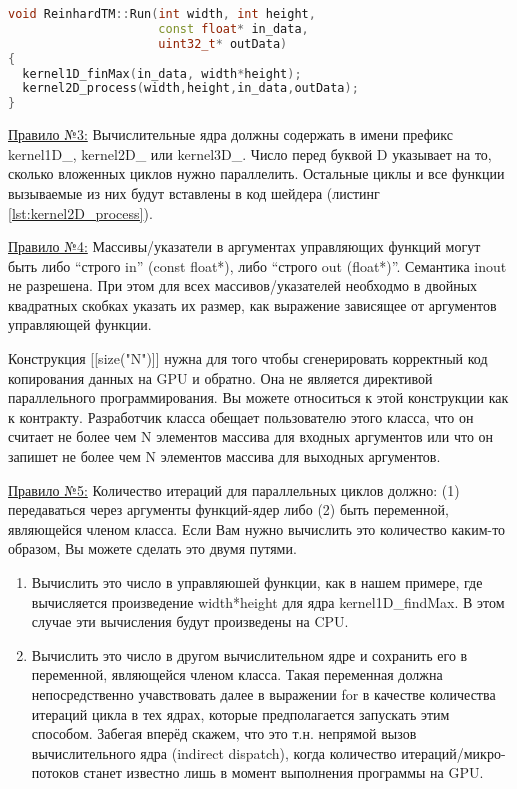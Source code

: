 \documentclass[11pt,fleqn,english,russian]{report} %
\begin{document}
\begin{lstlisting}[language=C++, 
	               caption=реализация управляющей функции Run, 
	               label=lst:RunFunc]	
void ReinhardTM::Run(int width, int height, 
                     const float* in_data, 
                     uint32_t* outData)
{
  kernel1D_finMax(in_data, width*height);
  kernel2D_process(width,height,in_data,outData);
}
\end{lstlisting}

\underline{Правило №3:} Вычислительные ядра должны содержать в имени префикс kernel1D\_, kernel2D\_ или kernel3D\_. Число перед буквой D указывает на то, сколько вложенных циклов нужно параллелить. Остальные циклы и все функции вызываемые из них будут вставлены в код шейдера (листинг \ref{lst:kernel2D_process}). 

\underline{Правило №4:} Массивы/указатели в аргументах управляющих функций могут быть либо ``строго in'' (const float*), либо ``строго out (float*)''. Семантика inout не разрешена. При этом для всех массивов/указателей необходмо в двойных квадратных скобках указать их размер, как выражение зависящее от аргументов управляющей функции.  

\begin{remark}
Конструкция [[size("N")]] нужна для того чтобы сгенерировать корректный код копирования данных на GPU и обратно. Она не является директивой параллельного программирования. Вы можете относиться к этой конструкции как к контракту. Разработчик класса обещает пользователю этого класса, что он считает не более чем N элементов массива для входных аргументов или что он запишет не более чем N элементов массива для выходных аргументов. 
\end{remark}	


\underline{Правило №5:} Количество итераций для параллельных циклов должно: (1) передаваться через аргументы функций-ядер либо (2) быть переменной, являющейся членом класса. Если Вам нужно вычислить это количество каким-то образом, Вы можете сделать это двумя путями.
\begin{enumerate}
\item Вычислить это число в управляюшей функции, как в нашем примере, где вычисляется произведение width*height для ядра kernel1D\_findMax. В этом случае эти вычисления будут произведены на CPU.
\item Вычислить это число в другом вычислительном ядре и сохранить его в переменной, являющейся членом класса. Такая переменная должна непосредственно учавствовать далее в выражении for в качестве количества итераций цикла в тех ядрах, которые предполагается запускать этим способом. Забегая вперёд скажем, что это т.н. непрямой вызов вычислительного ядра (indirect dispatch), когда количество итераций/микро-потоков станет известно лишь в момент выполнения программы на GPU. 
\end{enumerate}
\end{document}
